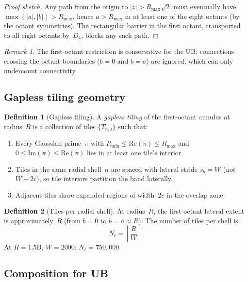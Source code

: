 \documentclass[11pt,a4paper]{article}
\theoremstyle{definition}
\newtheorem{definition}{Definition}[section]
\theoremstyle{plain}
\theoremstyle{remark}
\newtheorem{remark}[theorem]{Remark}
\begin{document}
\begin{proof}[Proof sketch]
Any path from the origin to $|z| > R_{\max}\sqrt{2}$ must eventually have $\max(|a|, |b|) > R_{\max}$, hence $a > R_{\max}$ in at least one of the eight octants (by the octant symmetries).  The rectangular barrier in the first octant, transported to all eight octants by~$D_4$, blocks any such path.
\end{proof}

\begin{remark}\label{rem:octant-conservative}
The first-octant restriction is conservative for the UB\@: connections crossing the octant boundaries ($b = 0$ and $b = a$) are ignored, which can only undercount connectivity.
\end{remark}

\subsection{Gapless tiling geometry}

\begin{definition}[Gapless tiling]\label{def:gapless}
A \emph{gapless tiling} of the first-octant annulus at radius~$R$ is a collection of tiles $\{T_{n,j}\}$ such that:
\begin{enumerate}
  \item Every Gaussian prime~$\pi$ with $R_{\min} \le \mathrm{Re}(\pi) \le R_{\max}$ and $0 \le \mathrm{Im}(\pi) \le \mathrm{Re}(\pi)$ lies in at least one tile's interior.
  \item Tiles in the same radial shell~$n$ are spaced with lateral stride $s_b = W$ (not $W + 2c$), so tile interiors partition the band laterally.
  \item Adjacent tiles share expanded regions of width~$2c$ in the overlap zone.
\end{enumerate}
\end{definition}

\begin{definition}[Tiles per radial shell]\label{def:tiles-per-shell}
At radius~$R$, the first-octant lateral extent is approximately~$R$ (from $b = 0$ to $b = a \approx R$).  The number of tiles per shell is
\[
  N_\ell = \left\lceil \frac{R}{W} \right\rceil.
\]
At $R = 1.5\text{B}$, $W = 2000$: $N_\ell = 750{,}000$.
\end{definition}

\subsection{Composition for UB}
\end{document}
